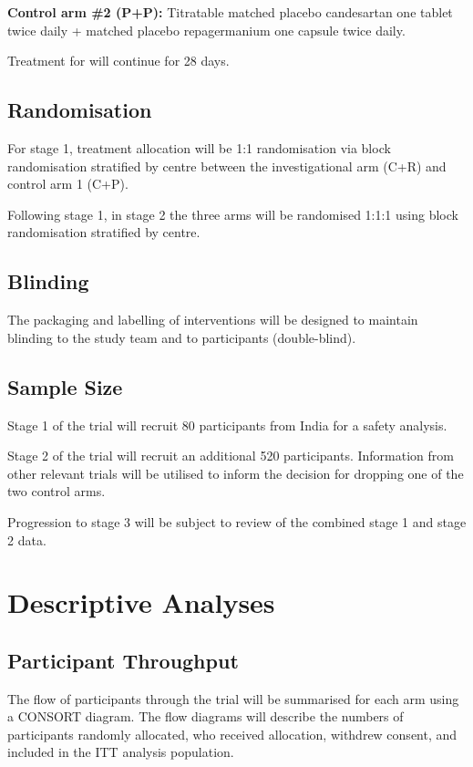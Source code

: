 \documentclass[11pt,parskip=half-]{scrartcl}
\begin{document}
\textbf{Control arm \#2 (P+P):}  Titratable matched placebo candesartan
one tablet twice daily + matched placebo repagermanium one capsule twice daily.

Treatment for will continue for 28 days.

\subsection{Randomisation}
For stage 1, treatment allocation will be 1:1 randomisation via block randomisation stratified by centre between the investigational arm (C+R) and control arm 1 (C+P).

Following stage 1, in stage 2 the three arms will be randomised 1:1:1 using block randomisation stratified by centre.

\subsection{Blinding}
The packaging and labelling of interventions will be designed to maintain blinding to the study team and to participants (double-blind).

\subsection{Sample Size}
Stage 1 of the trial will recruit 80 participants from India for a safety analysis.

Stage 2 of the trial will recruit an additional 520 participants. Information from other relevant trials will be utilised to inform the decision for dropping one of the two control arms.

Progression to stage 3 will be subject to review of the combined stage 1 and stage 2 data.

\clearpage

\section{Descriptive Analyses}

\subsection{Participant Throughput}
The flow of participants through the trial will be summarised for each arm using a CONSORT diagram. The flow diagrams will describe the numbers of participants randomly allocated, who received allocation, withdrew consent, and included in the ITT analysis population.
\end{document}

